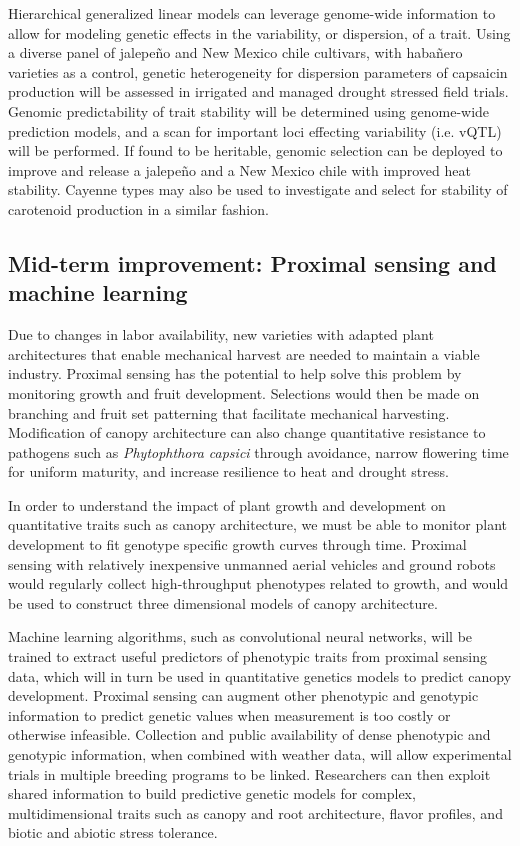 \documentclass[11pt]{article}
\begin{document}
Hierarchical generalized linear models can leverage genome-wide information to allow for modeling genetic effects in the variability, or dispersion, of a trait. Using a diverse panel of jalepe\~{n}o and New Mexico chile cultivars, with haba\~{n}ero varieties  as a control, genetic heterogeneity for dispersion parameters of capsaicin production will be assessed in irrigated and managed drought stressed field trials. Genomic predictability of trait stability will be determined using genome-wide prediction models, and a scan for important loci effecting variability (i.e. vQTL) will be performed. If found to be heritable, genomic selection can be deployed to improve and release a jalepe\~{n}o and a New Mexico chile with improved heat stability. Cayenne types may also be used to investigate and select for stability of carotenoid production in a similar fashion. 


\subsection*{Mid-term improvement: Proximal sensing and machine learning}

Due to changes in labor availability, new varieties with adapted plant architectures that enable mechanical harvest are needed to maintain a viable industry. Proximal sensing has the potential to help solve this problem by monitoring growth and fruit development. Selections would then be made on branching and fruit set patterning that facilitate mechanical harvesting. Modification of canopy architecture can also change quantitative resistance to pathogens such as \emph{Phytophthora capsici} through avoidance, narrow flowering time for uniform maturity, and increase resilience to heat and drought stress.

In order to understand the impact of plant growth and development on quantitative traits such as canopy architecture, we must be able to monitor plant development to fit genotype specific growth curves through time. Proximal sensing with relatively inexpensive unmanned aerial vehicles and ground robots would regularly collect high-throughput phenotypes related to growth, and would be used to construct three dimensional models of canopy architecture. 

Machine learning algorithms, such as convolutional neural networks, will be trained to extract useful predictors of phenotypic traits from proximal sensing data, which will in turn be used in quantitative genetics models to predict canopy development. Proximal sensing can augment other phenotypic and genotypic information to predict genetic values when measurement is too costly or otherwise infeasible. Collection and public availability of dense phenotypic and genotypic information, when combined with weather data, will allow experimental trials in multiple breeding programs to be linked. Researchers can then exploit shared information to build predictive genetic models for complex, multidimensional traits such as canopy and root architecture, flavor profiles, and biotic and abiotic stress tolerance.
\end{document}

